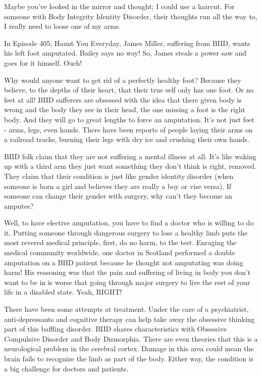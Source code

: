 \documentclass[12pt,a4paper,onecolumn]{article}
\begin{document}
Maybe you've looked in the mirror and thought; I could use a haircut. For someone with Body
Integrity Identity Disorder, their thoughts run all the way to, I really need to loose one of my
arms.

In Episode 405, Haunt You Everyday, James Miller, suffering from BIID, wants his left foot
amputated\cite{amputate}. Bailey says no way! So, James steals a power saw and goes for it himself.
Ouch!

Why would anyone want to get rid of a perfectly healthy foot? Because they believe, to the depths of
their heart, that their true self only has one foot. Or no feet at all! BIID sufferers are obsessed
with the idea that there given body is wrong and the body they see in their head, the one missing a
foot is the right body. And they will go to great lengths to force an amputation. It's not just feet
- arms, legs, even hands. There have been reports of people laying their arms on a railroad tracks,
burning their legs with dry ice and crushing their own hands.

BIID folk claim that they are not suffering a mental illness at all. It's like waking up with a
third arm they just want something they don't think is right, removed. They claim that their
condition is just like gender identity disorder (when someone is born a girl and believes they are
really a boy or vise versa). If someone can change their gender with surgery, why can't they become
an amputee?

Well, to have elective amputation, you have to find a doctor who is willing to do it. Putting
someone through dangerous surgery to lose a healthy limb puts the most revered medical principle,
first, do no harm, to the test. Enraging the medical community worldwide, one doctor in Scotland
performed a double amputation on a BIID patient because he thought not amputating was doing harm!
His reasoning was that the pain and suffering of living in body you don't want to be in is worse
that going through major surgery to live the rest of your life in a disabled state. Yeah, RIGHT!

There have been some attempts at treatment. Under the care of a psychiatrist, anti-depressants and
cognitive\cite{cognitive} therapy can help take away the obsessive thinking part of this baffling
disorder. BIID shares characteristics with Obsessive Compulsive Disorder and Body Dismorphia. There
are even theories that this is a neurological problem in the cerebral\cite{cerebral}
cortex\cite{cortex}. Damage in this area could mean the brain fails to recognize the limb as part of
the body. Either way, the condition is a big challenge for doctors and patients.
\end{document}
